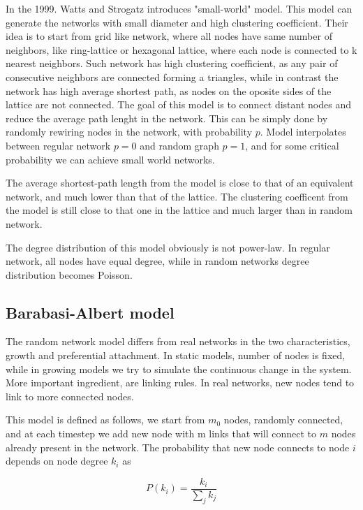 In the 1999. Watts and Strogatz introduces "small-world" model. This model can generate the networks with small diameter and high clustering coefficient. Their idea is to start from grid like network, where all nodes have same number of neighbors, like ring-lattice or hexagonal lattice, where each node is connected to k nearest neighbors. Such network has high clustering coefficient, as any pair of consecutive neighbors are connected forming a triangles, while in contrast the network has high average shortest path, as nodes on the oposite sides of the lattice are not connected. The goal of this model is to connect distant nodes and reduce the average path lenght in the network. This can be simply done by randomly rewiring nodes in the network, with probability $p$. Model interpolates between regular network $p=0$ and random graph $p=1$, and for some critical probability we can achieve small world networks. 


The average shortest-path length from the model is close to that of an equivalent network, and much lower than that of the lattice. The clustering coefficent from the model is still close to that one in the lattice and much larger than in random network. 

The degree distribution of this model obviously is not power-law. In regular network, all nodes have equal degree, while in random networks degree distribution becomes Poisson. 

\subsection{Barabasi-Albert model}

The random network model differs from real networks in the two characteristics, growth and preferential attachment. In static models, number of nodes is fixed, while in growing models we try to simulate the continuous change in the system. More important ingredient, are linking rules. In real networks, new nodes tend to link to more connected nodes.

This model is defined as follows, we start from $m_0$ nodes, randomly connected, and at each timestep we add new node with m links that will connect to $m$ nodes already present in the network.  The probability that new node connects to node $i$ depends on node degree $k_i$ as

\begin{equation}
P(k_i) = \frac{k_i}{\sum_jk_j} 
\end{equation} 


